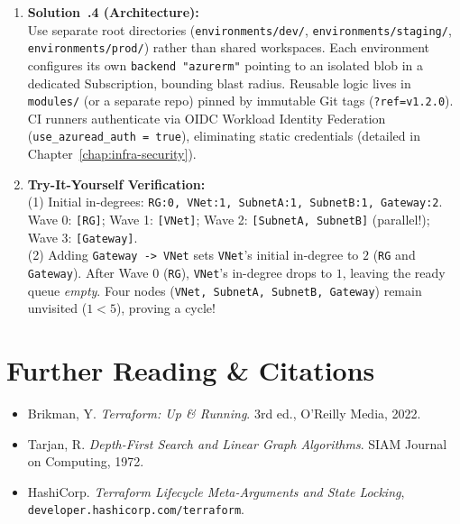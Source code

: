 \begin{enumerate}[leftmargin=18pt]
  \item \textbf{Solution~\thechapter.4 (Architecture):}\\
  Use separate root directories (\texttt{environments/dev/}, \texttt{environments/staging/}, \texttt{environments/prod/}) rather than shared workspaces. Each environment configures its own \texttt{backend "azurerm"} pointing to an isolated blob in a dedicated Subscription, bounding blast radius. Reusable logic lives in \texttt{modules/} (or a separate repo) pinned by immutable Git tags (\texttt{?ref=v1.2.0}). CI runners authenticate via OIDC Workload Identity Federation (\texttt{use\_azuread\_auth = true}), eliminating static credentials (detailed in Chapter~\ref{chap:infra-security}).

  \item \textbf{Try-It-Yourself Verification:}\\
  (1) Initial in-degrees: \texttt{RG:0, VNet:1, SubnetA:1, SubnetB:1, Gateway:2}. Wave 0: \texttt{[RG]}; Wave 1: \texttt{[VNet]}; Wave 2: \texttt{[SubnetA, SubnetB]} (parallel!); Wave 3: \texttt{[Gateway]}.\\
  (2) Adding \texttt{Gateway -> VNet} sets \texttt{VNet}'s initial in-degree to $2$ (\texttt{RG} and \texttt{Gateway}). After Wave 0 (\texttt{RG}), \texttt{VNet}'s in-degree drops to $1$, leaving the ready queue \emph{empty}. Four nodes (\texttt{VNet, SubnetA, SubnetB, Gateway}) remain unvisited ($1 < 5$), proving a cycle!
\end{enumerate}

\section{Further Reading \protect\& Citations}
\begin{itemize}[leftmargin=15pt]
  \item Brikman, Y. \emph{Terraform: Up \& Running}. 3rd ed., O'Reilly Media, 2022.
  \item Tarjan, R. \emph{Depth-First Search and Linear Graph Algorithms}. SIAM Journal on Computing, 1972.
  \item HashiCorp. \emph{Terraform Lifecycle Meta-Arguments and State Locking}, \texttt{developer.hashicorp.com/terraform}.
\end{itemize}
